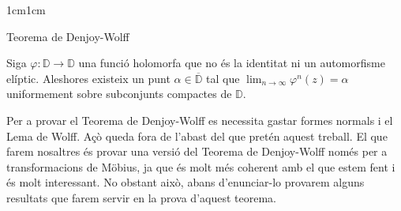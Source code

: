 \begin{adjustwidth}{1cm}{1cm}
\begin{subsection}{Teorema de Denjoy-Wolff}
    \begin{teorema}
        Siga $\varphi: \mathbb{D}\to \mathbb{D}$ una funció holomorfa que no és la identitat ni un automorfisme elíptic. Aleshores existeix un punt $\alpha\in \overline{\mathbb{D}}$ tal que $\displaystyle\lim_{n\to\infty}\varphi^n(z)=\alpha$ uniformement sobre subconjunts compactes de $\mathbb{D}$.
    \end{teorema}

    Per a provar el Teorema de Denjoy-Wolff es necessita gastar formes normals i el Lema de Wolff. Açò queda fora de l'abast del que pretén aquest treball. El que farem nosaltres és provar una versió del Teorema de Denjoy-Wolff només per a transformacions de Möbius, ja que és molt més coherent amb el que estem fent i és molt interessant. No obstant això, abans d'enunciar-lo provarem alguns resultats que farem servir en la prova d'aquest teorema.





\end{subsection}
\end{adjustwidth}

